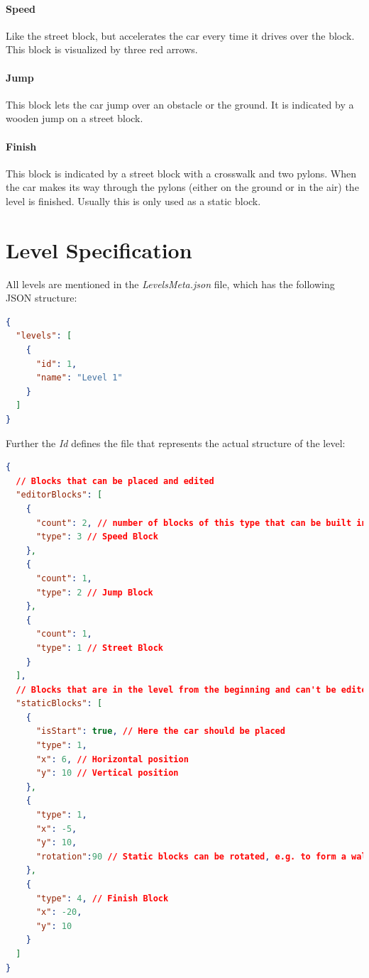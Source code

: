 \documentclass{vgtc}                          %
\begin{document}
\paragraph{Speed}
Like the street block, but accelerates the car every time it drives over the block. This block is visualized by three red arrows.

\paragraph{Jump}
This block lets the car jump over an obstacle or the ground. It is indicated by a wooden jump on a street block.

\paragraph{Finish}
This block is indicated by a street block with a crosswalk and two pylons. When the car makes its way through the pylons (either on the ground or in the air) the level is finished.
Usually this is only used as a static block.

\section{Level Specification}
All levels are mentioned in the \textit{LevelsMeta.json} file, which has the following JSON structure:

\begin{lstlisting}[language=json,firstnumber=1]
{
  "levels": [
    {
      "id": 1,
      "name": "Level 1"
    }
  ]
}
\end{lstlisting}

Further the \textit{Id} defines the file that represents the actual structure of the level:

\begin{lstlisting}[language=json,firstnumber=1]
{
  // Blocks that can be placed and edited
  "editorBlocks": [
    {
      "count": 2, // number of blocks of this type that can be built in this level
      "type": 3 // Speed Block
    },
    {
      "count": 1,
      "type": 2 // Jump Block
    },
    {
      "count": 1,
      "type": 1 // Street Block
    }
  ],
  // Blocks that are in the level from the beginning and can't be edited.
  "staticBlocks": [
    {
      "isStart": true, // Here the car should be placed
      "type": 1, 
      "x": 6, // Horizontal position
      "y": 10 // Vertical position
    },
    {
      "type": 1,
      "x": -5,
      "y": 10,
      "rotation":90 // Static blocks can be rotated, e.g. to form a wall
    },
    {
      "type": 4, // Finish Block
      "x": -20,
      "y": 10
    }
  ]
}
\end{lstlisting}
\end{document}
